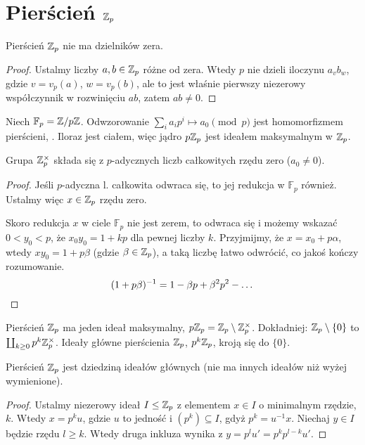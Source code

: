 \section{Pierścień $\mathbb Z_p$}
\begin{fakt}
	Pierścień $\mathbb Z_p$ nie ma dzielników zera.
\end{fakt}

\begin{proof}
	Ustalmy liczby $a, b \in \mathbb Z_p$ różne od zera.
	Wtedy $p$ nie dzieli iloczynu $a_vb_w$, gdzie $v = v_p(a)$, $w = v_p(b)$, ale to jest właśnie pierwszy niezerowy współczynnik w rozwinięciu $ab$, zatem $ab \neq 0$.
\end{proof}

Niech $\mathbb F_p = \mathbb Z / p\mathbb Z$. Odwzorowanie $\sum_i a_ip^i \mapsto a_0 \pmod p$ jest homomorfizmem pierścieni, .
Iloraz jest ciałem, więc jądro $p\mathbb Z_p$ jest ideałem maksymalnym w $\mathbb Z_p$.

\begin{fakt}
	Grupa $\mathbb Z_p^\times$ składa się z $p$-adycznych liczb całkowitych rzędu zero ($a_0 \neq 0$).
\end{fakt}

\begin{proof}
	Jeśli $p$-adyczna l. całkowita odwraca się, to jej redukcja w $\mathbb F_p$ również.
	Ustalmy więc $x \in \mathbb Z_p$ rzędu zero.

	Skoro redukcja $x$ w ciele $\mathbb F_p$ nie jest zerem, to odwraca się i możemy wskazać $0 < y_0 < p$, że $x_0 y_0 =  1+  kp$ dla pewnej liczby $k$.
	Przyjmijmy, że $x = x_0 + p \alpha$, wtedy $xy_0 = 1 + p \beta$ (gdzie $\beta \in \mathbb Z_p$), a taką liczbę łatwo odwrócić, co jakoś kończy rozumowanie.
	\[
		(1+p\beta)^{-1} = 1 - \beta p + \beta^2p^2 - \ldots \qedhere
	\]
\end{proof}

Pierścień $\mathbb Z_p$ ma jeden ideał maksymalny, $p \mathbb Z_p = \mathbb Z_p \setminus \mathbb Z_p^\times$.
Dokładniej: $\mathbb Z_p \setminus \{0\}$ to $\coprod_{k \ge 0} p^k \mathbb Z_p^\times$.
Ideały główne pierścienia $\mathbb Z_p$, $p^k \mathbb Z_p$, kroją się do $\{0\}$.

\begin{fakt}
	Pierścień $\mathbb Z_p$ jest dziedziną ideałów głównych (nie ma innych ideałów niż wyżej wymienione).
\end{fakt}

\begin{proof}
	Ustalmy  niezerowy ideał $I \le \mathbb Z_p$ z elementem $x \in I$ o minimalnym rzędzie, $k$.
	Wtedy $x = p^k u$, gdzie $u$ to jedność i $(p^k) \subseteq I$, gdyż $p^k = u^{-1} x$.
	Niechaj $y \in I$ będzie rzędu $l \ge k$.
	Wtedy druga inkluza wynika z $y = p^l u' = p^k p^{l-k} u'$.
\end{proof}
